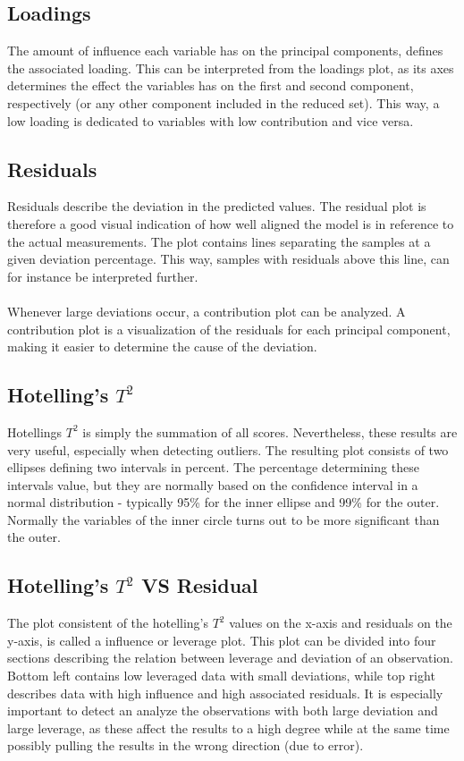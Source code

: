 \subsection{Loadings}
The amount of influence each variable has on the principal components, defines the associated loading. This can be interpreted from the loadings plot, as its axes determines the effect the variables has on the first and second component, respectively (or any other component included in the reduced set). This way, a low loading is dedicated to variables with low contribution and vice versa. 

\subsection{Residuals}
Residuals describe the deviation in the predicted values. The residual plot is therefore a good visual indication of how well aligned the model is in reference to the actual measurements. The plot contains lines separating the samples at a given deviation percentage. This way, samples with residuals above this line, can for instance be interpreted further.
\\\\
Whenever large deviations occur, a contribution plot can be analyzed. A contribution plot is a visualization of the residuals for each principal component, making it easier to determine the cause of the deviation. 

\subsection{Hotelling's $T^2$} \label{sec:hotellings}
Hotellings $T^2$ is simply the summation of all scores. Nevertheless, these results are very useful, especially when detecting outliers. The resulting plot consists of two ellipses defining two intervals in percent. The percentage determining these intervals value, but they are normally based on the confidence interval in a normal distribution - typically 95\% for the inner ellipse and 99\% for the outer. Normally the variables of the inner circle turns out to be more significant than the outer. 

\subsection{Hotelling's $T^2$ VS Residual} \label{sec:vs}
The plot consistent of the hotelling’s $T^2$ values on the x-axis and residuals on the y-axis, is called a influence or leverage plot. This plot can be divided into four sections describing the relation between leverage and deviation of an observation. Bottom left contains low leveraged data with small deviations, while top right describes data with high influence and high associated residuals. It is especially important to detect an analyze the observations with both large deviation and large leverage, as these affect the results to a high degree while at the same time possibly pulling the results in the wrong direction (due to error). 


